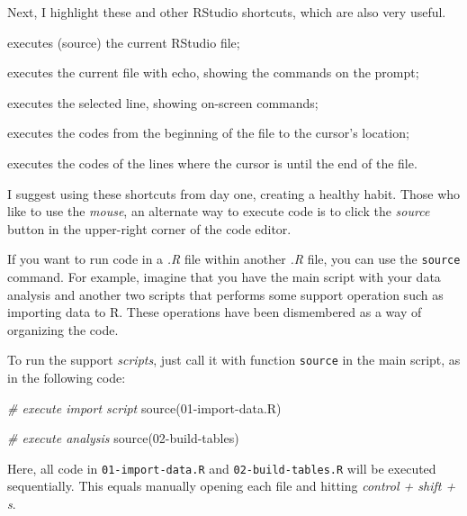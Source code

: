 \documentclass[
  12pt,
]{book}
\newenvironment{Shaded}{\begin{snugshade}}{\end{snugshade}}
\newcommand{\CommentTok}[1]{\textcolor[rgb]{0.37,0.37,0.37}{\textit{#1}}}
\newcommand{\FunctionTok}[1]{\textcolor[rgb]{0,0,0}{#1}}
\newcommand{\NormalTok}[1]{#1}
\newcommand{\StringTok}[1]{\textcolor[rgb]{0.5,0.5,0.5}{#1}}
\providecommand{\tightlist}{%
  \setlength{\itemsep}{0pt}\setlength{\parskip}{0pt}}
\begin{document}
Next, I highlight these and other RStudio shortcuts, which are also very useful.

\begin{description}
\tightlist
\item[control + shift + s]
executes (source) the current RStudio file;
\item[control + shift + enter]
executes the current file with echo, showing the commands on the prompt;
\item[control + enter]
executes the selected line, showing on-screen commands;
\item[control + shift + b]
executes the codes from the beginning of the file to the cursor's location;
\item[control + shift + e]
executes the codes of the lines where the cursor is until the end of the file.
\end{description}

I suggest using these shortcuts from day one, creating a healthy habit. Those who like to use the \emph{mouse}, an alternate way to execute code is to click the \emph{source} button in the upper-right corner of the code editor.

If you want to run code in a \emph{.R} file within another \emph{.R} file, you can use the \texttt{source} command. For example, imagine that you have the main script with your data analysis and another two scripts that performs some support operation such as importing data to R. These operations have been dismembered as a way of organizing the code. 

To run the support \emph{scripts}, just call it with function \texttt{source} in the main script, as in the following code:

\begin{Shaded}
\begin{Highlighting}[]
\CommentTok{\# execute import script}
\FunctionTok{source}\NormalTok{(}\StringTok{\textquotesingle{}01{-}import{-}data.R\textquotesingle{}}\NormalTok{)}

\CommentTok{\# execute analysis}
\FunctionTok{source}\NormalTok{(}\StringTok{\textquotesingle{}02{-}build{-}tables\textquotesingle{}}\NormalTok{)}
\end{Highlighting}
\end{Shaded}

Here, all code in \texttt{01-import-data.R} and \texttt{02-build-tables.R} will be executed sequentially. This equals manually opening each file and hitting \emph{control + shift + s}.
\end{document}

